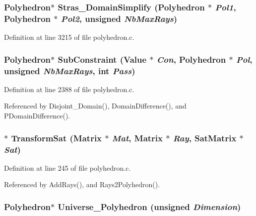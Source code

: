 \subsubsection{\setlength{\rightskip}{0pt plus 5cm}Polyhedron$\ast$ Stras\_\-Domain\-Simplify (Polyhedron $\ast$ {\em Pol1}, Polyhedron $\ast$ {\em Pol2}, unsigned {\em Nb\-Max\-Rays})}\label{polyhedron_8c_a43}




Definition at line 3215 of file polyhedron.c.
\subsubsection{\setlength{\rightskip}{0pt plus 5cm}Polyhedron$\ast$ Sub\-Constraint (Value $\ast$ {\em Con}, Polyhedron $\ast$ {\em Pol}, unsigned {\em Nb\-Max\-Rays}, int {\em Pass})}\label{polyhedron_8c_a31}




Definition at line 2388 of file polyhedron.c.

Referenced by Disjoint\_\-Domain(), Domain\-Difference(), and PDomain\-Difference().

\subsubsection{$\ast$ Transform\-Sat (Matrix $\ast$ {\em Mat}, Matrix $\ast$ {\em Ray}, {\bf Sat\-Matrix} $\ast$ {\em Sat})\hspace{0.3cm}{\tt  [static]}}\label{polyhedron_8c_a12}




Definition at line 245 of file polyhedron.c.

Referenced by Add\-Rays(), and Rays2Polyhedron().

\subsubsection{\setlength{\rightskip}{0pt plus 5cm}Polyhedron$\ast$ Universe\_\-Polyhedron (unsigned {\em Dimension})}\label{polyhedron_8c_a23}




